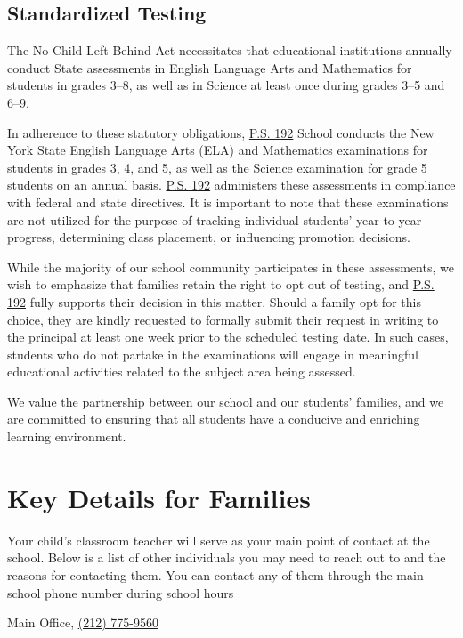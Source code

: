\documentclass[11pt, letterpaper]{article}
\begin{document}
\subsection{Standardized Testing}
The No Child Left Behind Act necessitates that educational institutions annually conduct State assessments in English Language Arts and Mathematics for students in grades 3–8, as well as in Science at least once during grades 3–5 and 6–9.

In adherence to these statutory obligations, \href{https://www.ps192.org}{P.S. 192} School conducts the New York State English Language Arts (ELA) and Mathematics examinations for students in grades 3, 4, and 5, as well as the Science examination for grade 5 students on an annual basis. \href{https://www.ps192.org}{P.S. 192} administers these assessments in compliance with federal and state directives. It is important to note that these examinations are not utilized for the purpose of tracking individual students' year-to-year progress, determining class placement, or influencing promotion decisions.

While the majority of our school community participates in these assessments, we wish to emphasize that families retain the right to opt out of testing, and \href{https://www.ps192.org}{P.S. 192} fully supports their decision in this matter. Should a family opt for this choice, they are kindly requested to formally submit their request in writing to the principal at least one week prior to the scheduled testing date. In such cases, students who do not partake in the examinations will engage in meaningful educational activities related to the subject area being assessed.

We value the partnership between our school and our students' families, and we are committed to ensuring that all students have a conducive and enriching learning environment.

\section{Key Details for Families}
Your child's classroom teacher will serve as your main point of contact at the school. Below is a list of other individuals you may need to reach out to and the reasons for contacting them. You can contact any of them through the main school phone number during school hours

Main Office, \href{tel:2127759560}{(212) 775-9560}
\end{document}
